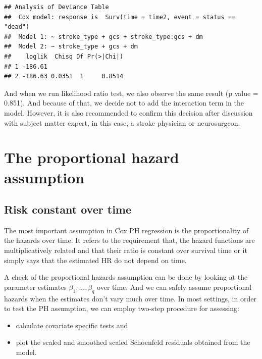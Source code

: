 \documentclass[
  10pt,
]{krantz}
\providecommand{\tightlist}{%
  \setlength{\itemsep}{0pt}\setlength{\parskip}{0pt}}
\begin{document}
\begin{verbatim}
## Analysis of Deviance Table
##  Cox model: response is  Surv(time = time2, event = status == "dead")
##  Model 1: ~ stroke_type + gcs + stroke_type:gcs + dm
##  Model 2: ~ stroke_type + gcs + dm
##    loglik  Chisq Df Pr(>|Chi|)
## 1 -186.61                     
## 2 -186.63 0.0351  1     0.8514
\end{verbatim}

And when we run likelihood ratio test, we also observe the same result (p value = 0.851). And because of that, we decide not to add the interaction term in the model. However, it is also recommended to confirm this decision after discussion with subject matter expert, in this case, a stroke physician or neurosurgeon.

\hypertarget{the-proportional-hazard-assumption}{%
\section{\texorpdfstring{The proportional hazard assumption}{The proportional hazard assumption}}\label{the-proportional-hazard-assumption}}

\hypertarget{risk-constant-over-time}{%
\subsection{Risk constant over time}\label{risk-constant-over-time}}

The most important assumption in Cox PH regression is the proportionality of the hazards over time. It refers to the requirement that, the hazard functions are multiplicatively related and that their ratio is constant over survival time or it simply says that the estimated HR do not depend on time.

A check of the proportional hazards assumption can be done by looking at the parameter estimates \(\beta_1, ..., \beta_q\) over time. And we can safely assume proportional hazards when the estimates don't vary much over time. In most settings, in order to test the PH assumption, we can employ two-step procedure for assessing:

\begin{itemize}
\tightlist
\item
  calculate covariate specific tests and
\item
  plot the scaled and smoothed scaled Schoenfeld residuals obtained from the model.
\end{itemize}
\end{document}
